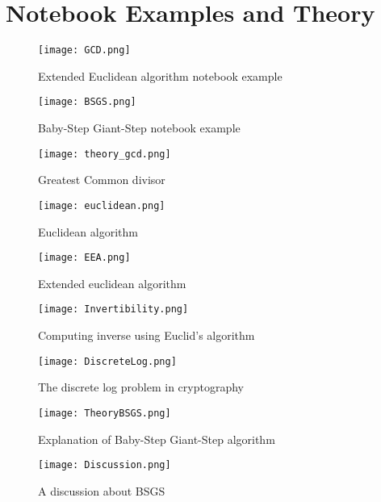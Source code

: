 \documentclass{article}
\begin{document}
\section*{Notebook Examples and Theory}
\begin{figure}
  \texttt{[image: GCD.png]}
  \caption{Extended Euclidean algorithm notebook example}
  \label{fig:D_P}
 \end{figure}

\begin{figure}
  \texttt{[image: BSGS.png]}
  \caption{Baby-Step Giant-Step notebook example}
  \label{fig:D_P}
\end{figure}

\begin{figure}
  \texttt{[image: theory\_gcd.png]}
  \caption{Greatest Common divisor}
  \label{fig:D_P}
\end{figure}

\begin{figure}
  \texttt{[image: euclidean.png]}
  \caption{Euclidean algorithm}
  \label{fig:D_P}
\end{figure}

\begin{figure}
  \texttt{[image: EEA.png]}
  \caption{Extended euclidean algorithm}
  \label{fig:D_P}
\end{figure}

\begin{figure}
  \texttt{[image: Invertibility.png]}
  \caption{Computing inverse using Euclid's algorithm}
  \label{fig:D_P}
\end{figure}

\begin{figure}
  \texttt{[image: DiscreteLog.png]}
  \caption{The discrete log problem in cryptography}
  \label{fig:D_P}
\end{figure}

\begin{figure}
  \texttt{[image: TheoryBSGS.png]}
  \caption{Explanation of Baby-Step Giant-Step algorithm}
  \label{fig:D_P}
\end{figure}

\begin{figure}
  \texttt{[image: Discussion.png]}
  \caption{A discussion about BSGS}
  \label{fig:D_P}
\end{figure}
\end{document}
